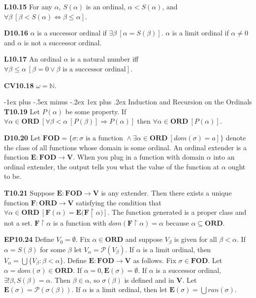 \documentclass[10pt, landscape]{article}
\makeatletter
\renewcommand{\subsection}{\@startsection{subsection}{3}{0mm}%
                                {-1ex plus -.5ex minus -.2ex}%
                                {1ex plus .2ex}%
                                {\normalfont\small\bfseries}}%
\makeatother
\begin{document}
\begin{multicols*}{3}
\textbf{L10.15} For any $\alpha$, $S(\alpha)$ is an ordinal, $\alpha < S(\alpha)$, and $\forall\beta\ [\beta<S(\alpha)\Longleftrightarrow \beta \leq \alpha]$.

\textbf{D10.16} $\alpha$ is a successor ordinal if $\exists \beta \ [\alpha=S(\beta)]$. $\alpha$ is a limit ordinal if $\alpha\neq0$ and $\alpha$ is not a successor ordinal.

\textbf{L10.17} An ordinal $\alpha$ is a natural number iff $\forall \beta \leq \alpha \ [\beta=0\lor \beta \text{ is a successor ordinal}]$.

\textbf{CV10.18} $\omega=\mathbb{N}$.

\subsection{Induction and Recursion on the Ordinals}
\textbf{T10.19} Let $P(\alpha)$ be some property. If $\forall \alpha \in \mathbf{ORD}\ [\forall \beta < \alpha\ [P(\beta)] \Longrightarrow P(\alpha)]$ then $\forall \alpha \in \mathbf{ORD}\ [P(\alpha)]$.

\textbf{D10.20} Let $\mathbf{FOD}=\{\sigma:\sigma \text{ is a function }\land \exists \alpha \in \mathbf{ORD} \ [dom(\sigma)=a]\}$ denote the class of all functions whose domain is some ordinal. An ordinal extender is a function $\mathbf{E:FOD\rightarrow V}$. When you plug in a function with domain $\alpha$ into an ordinal extender, the output tells you what the value of the function at $\alpha$ ought to be.

\textbf{T10.21} Suppose $\mathbf{E:FOD\rightarrow V}$ is any extender. Then there exists a unique function $\mathbf{F:ORD\rightarrow V}$ satisfying the condition that $\forall \alpha \in \mathbf{ORD}\ [\mathbf{F}(\alpha)=\mathbf{E(F}\restriction\alpha)]$. The function generated is a proper class and not a set. $\mathbf{F}\restriction\alpha$ is a function with $dom(\mathbf{F}\restriction\alpha)=\alpha$ because $\alpha \subseteq \mathbf{ORD}$.

\textbf{EP10.24} Define $V_0=\emptyset$. Fix $\alpha \in \mathbf{ORD}$ and suppose $V_\beta$ is given for all $\beta<\alpha$. If $\alpha=S(\beta)$ for some $\beta$ let $V_\alpha=\mathcal{P}(V_\beta)$. If $\alpha$ is a limit ordinal, then $V_\alpha=\bigcup\{V_\beta:\beta<\alpha\}$. Define $\mathbf{E:FOD\rightarrow V}$ as follows. Fix $\sigma\in \mathbf{FOD}$. Let $\alpha=dom(\sigma)\in \mathbf{ORD}$. If $\alpha=0, \mathbf{E}(\sigma)=\emptyset$. If $\alpha$ is a successor ordinal, $\exists! \beta, S(\beta)=\alpha$. Then $\beta\in\alpha$, so $\sigma(\beta)$ is defined and in $\mathbf{V}$. Let $\mathbf{E}(\sigma)=\mathcal{P}(\sigma(\beta))$. If $\alpha$ is a limit ordinal, then let $\mathbf{E}(\sigma)=\bigcup ran(\sigma)$.


\end{multicols*}
\end{document}

